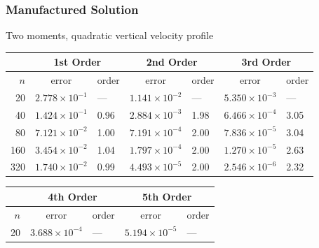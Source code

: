 \documentclass[10pt]{beamer}
\begin{document}
\begin{frame}
  \frametitle{Manufactured Solution}
  Two moments, quadratic vertical velocity profile
  \footnotesize
  \begin{table}
    \centering
    \begin{tabular}{r*{6}l}
      \toprule
            & \multicolumn{2}{c}{1st Order} & \multicolumn{2}{c}{2nd Order} & \multicolumn{2}{c}{3rd Order}                                              \\
      \midrule
      \(n\) & \multicolumn{1}{c}{error}     & order                         & \multicolumn{1}{c}{error}     & order & \multicolumn{1}{c}{error}  & order \\
      \midrule
      20    & \( 2.778 \times 10^{-1} \)    & ---                           & \( 1.141 \times 10^{-2} \)    & ---   & \( 5.350 \times 10^{-3} \) & ---   \\
      40    & \( 1.424 \times 10^{-1} \)    & 0.96                          & \( 2.884 \times 10^{-3} \)    & 1.98  & \( 6.466 \times 10^{-4} \) & 3.05  \\
      80    & \( 7.121 \times 10^{-2} \)    & 1.00                          & \( 7.191 \times 10^{-4} \)    & 2.00  & \( 7.836 \times 10^{-5} \) & 3.04  \\
      160   & \( 3.454 \times 10^{-2} \)    & 1.04                          & \( 1.797 \times 10^{-4} \)    & 2.00  & \( 1.270 \times 10^{-5} \) & 2.63  \\
      320   & \( 1.740 \times 10^{-2} \)    & 0.99                          & \( 4.493 \times 10^{-5} \)    & 2.00  & \( 2.546 \times 10^{-6} \) & 2.32  \\
      \bottomrule
    \end{tabular}
  \end{table}
  \begin{table}
    \centering
    \begin{tabular}{r*{4}l}
      \toprule
            & \multicolumn{2}{c}{4th Order} & \multicolumn{2}{c}{5th Order}                                       \\
      \midrule
      \(n\) & \multicolumn{1}{c}{error}     & order                         & \multicolumn{1}{c}{error}   & order \\
      \midrule
      20    & \( 3.688 \times 10^{ -4} \)   & ---                           & \( 5.194 \times 10^{ -5} \) & ---   \\

\end{tabular}
\end{table}
\end{frame}
\end{document}
